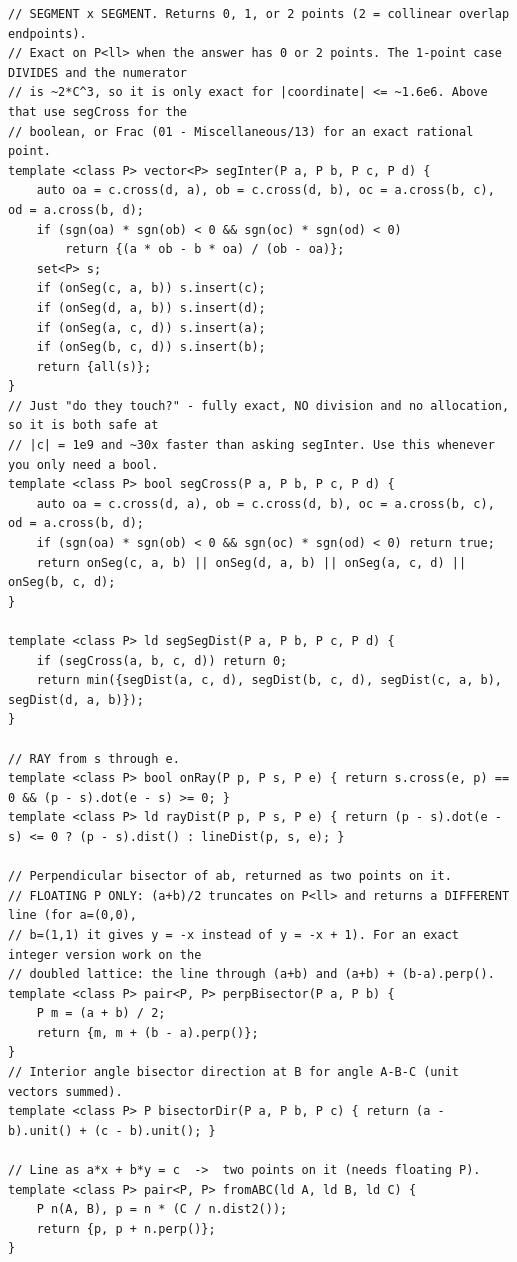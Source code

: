 \documentclass[9pt,a4paper,twocolumn]{extarticle}
\begin{document}
\begin{lstlisting}
// SEGMENT x SEGMENT. Returns 0, 1, or 2 points (2 = collinear overlap endpoints).
// Exact on P<ll> when the answer has 0 or 2 points. The 1-point case DIVIDES and the numerator
// is ~2*C^3, so it is only exact for |coordinate| <= ~1.6e6. Above that use segCross for the
// boolean, or Frac (01 - Miscellaneous/13) for an exact rational point.
template <class P> vector<P> segInter(P a, P b, P c, P d) {
    auto oa = c.cross(d, a), ob = c.cross(d, b), oc = a.cross(b, c), od = a.cross(b, d);
    if (sgn(oa) * sgn(ob) < 0 && sgn(oc) * sgn(od) < 0)
        return {(a * ob - b * oa) / (ob - oa)};
    set<P> s;
    if (onSeg(c, a, b)) s.insert(c);
    if (onSeg(d, a, b)) s.insert(d);
    if (onSeg(a, c, d)) s.insert(a);
    if (onSeg(b, c, d)) s.insert(b);
    return {all(s)};
}
// Just "do they touch?" - fully exact, NO division and no allocation, so it is both safe at
// |c| = 1e9 and ~30x faster than asking segInter. Use this whenever you only need a bool.
template <class P> bool segCross(P a, P b, P c, P d) {
    auto oa = c.cross(d, a), ob = c.cross(d, b), oc = a.cross(b, c), od = a.cross(b, d);
    if (sgn(oa) * sgn(ob) < 0 && sgn(oc) * sgn(od) < 0) return true;
    return onSeg(c, a, b) || onSeg(d, a, b) || onSeg(a, c, d) || onSeg(b, c, d);
}

template <class P> ld segSegDist(P a, P b, P c, P d) {
    if (segCross(a, b, c, d)) return 0;
    return min({segDist(a, c, d), segDist(b, c, d), segDist(c, a, b), segDist(d, a, b)});
}

// RAY from s through e.
template <class P> bool onRay(P p, P s, P e) { return s.cross(e, p) == 0 && (p - s).dot(e - s) >= 0; }
template <class P> ld rayDist(P p, P s, P e) { return (p - s).dot(e - s) <= 0 ? (p - s).dist() : lineDist(p, s, e); }

// Perpendicular bisector of ab, returned as two points on it.
// FLOATING P ONLY: (a+b)/2 truncates on P<ll> and returns a DIFFERENT line (for a=(0,0),
// b=(1,1) it gives y = -x instead of y = -x + 1). For an exact integer version work on the
// doubled lattice: the line through (a+b) and (a+b) + (b-a).perp().
template <class P> pair<P, P> perpBisector(P a, P b) {
    P m = (a + b) / 2;
    return {m, m + (b - a).perp()};
}
// Interior angle bisector direction at B for angle A-B-C (unit vectors summed).
template <class P> P bisectorDir(P a, P b, P c) { return (a - b).unit() + (c - b).unit(); }

// Line as a*x + b*y = c  ->  two points on it (needs floating P).
template <class P> pair<P, P> fromABC(ld A, ld B, ld C) {
    P n(A, B), p = n * (C / n.dist2());
    return {p, p + n.perp()};
}
\end{lstlisting}
\end{document}
